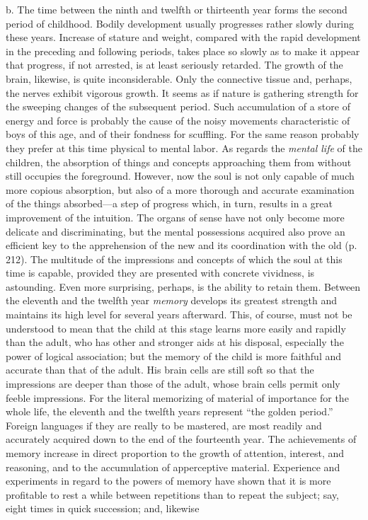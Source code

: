 b. The time between the ninth and twelfth or thirteenth year forms the second period of childhood. Bodily development usually progresses rather slowly during these years. Increase of stature and weight, compared with the rapid development in the preceding and following periods, takes place so slowly as to make it appear that progress, if not arrested, is at least seriously retarded. The growth of the brain, likewise, is quite inconsiderable. Only the connective tissue and, perhaps, the nerves exhibit vigorous growth. It seems as if nature is gathering strength for the sweeping changes of the subsequent period. Such accumulation of a store of energy and force is probably the cause of the noisy movements characteristic of boys of this age, and of their fondness for scuffling. For the same reason probably they prefer at this time physical to mental labor.
As regards the \emph{mental life} of the children, the absorption of things and concepts approaching them from without still occupies the foreground. However, now the soul is not only capable of much more copious absorption, but also of a more thorough and accurate examination of the things absorbed—a step of progress which, in turn, results in a great improvement of the intuition. The organs of sense have not only become more delicate and discriminating, but the mental possessions acquired also prove an efficient key to the apprehension of the new and its coordination with the old (p. 212). The multitude of the impressions and concepts of which the soul at this time is capable, provided they are presented with concrete vividness, is astounding. Even more surprising, perhaps, is the ability to retain them. Between the eleventh and the twelfth year \emph{memory} develops its greatest strength and maintains its high level for several years afterward. This, of course, must not be understood to mean that the child at this stage learns more easily and rapidly than the adult, who has other and stronger aids at his disposal, especially the power of logical association; but the memory of the child is more faithful and accurate than that of the adult. His brain cells are still soft so that the impressions are deeper than those of the adult, whose brain cells permit only feeble impressions. For the literal memorizing of material of importance for the whole life, the eleventh and the twelfth years represent “the golden period.” Foreign languages if they are really to be mastered, are most readily and accurately acquired down to the end of the fourteenth year. The achievements of memory increase in direct proportion to the growth of attention, interest, and reasoning, and to the accumulation of apperceptive material. Experience and experiments in regard to the powers of memory have shown that it is more profitable to rest a while between repetitions than to repeat the subject; say, eight times in quick succession; and, likewise
